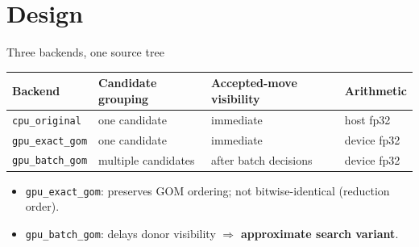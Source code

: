 \documentclass[aspectratio=169,11pt]{beamer}
\newcommand{\exactgpu}{\texttt{gpu\_exact\_gom}}
\newcommand{\batchgpu}{\texttt{gpu\_batch\_gom}}
\newcommand{\cpuoriginal}{\texttt{cpu\_original}}
\begin{document}
\section{Design}

\begin{frame}{Three backends, one source tree}
  \centering
  \small
  \begin{tabular}{lp{2.6cm}p{3.2cm}p{2.0cm}}
    \toprule
    Backend & Candidate grouping & Accepted-move visibility & Arithmetic \\
    \midrule
    \cpuoriginal & one candidate & immediate & host fp32 \\
    \exactgpu & one candidate & immediate & device fp32 \\
    \batchgpu & multiple candidates & after batch decisions & device fp32 \\
    \bottomrule
  \end{tabular}
  \vfill
  \begin{itemize}
    \item \exactgpu: preserves GOM ordering; not bitwise-identical (reduction order).
    \item \batchgpu: delays donor visibility $\Rightarrow$ \textbf{approximate search variant}.
  \end{itemize}
\end{frame}
\end{document}

